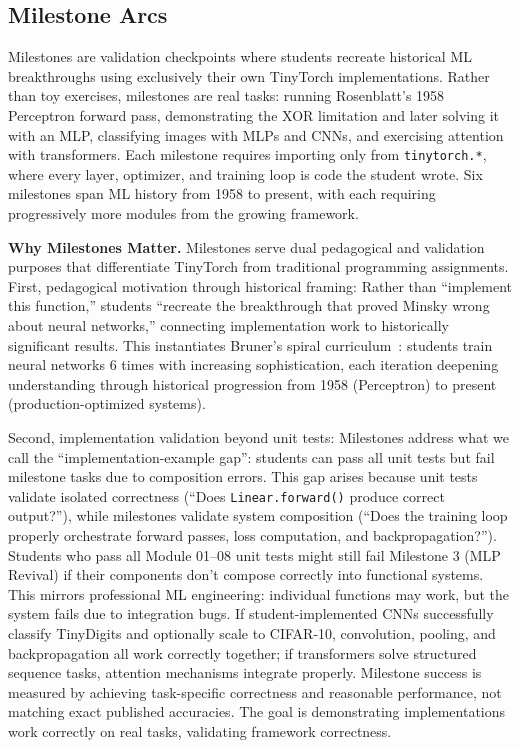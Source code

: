 \documentclass[10pt,twocolumn]{article}
\begin{document}
\subsection{Milestone Arcs}
\label{subsec:milestones}

Milestones are validation checkpoints where students recreate historical ML breakthroughs using exclusively their own TinyTorch implementations. Rather than toy exercises, milestones are real tasks: running Rosenblatt's 1958 Perceptron forward pass, demonstrating the XOR limitation and later solving it with an MLP, classifying images with MLPs and CNNs, and exercising attention with transformers. Each milestone requires importing only from \texttt{tinytorch.*}, where every layer, optimizer, and training loop is code the student wrote. Six milestones span ML history from 1958 to present, with each requiring progressively more modules from the growing framework.

\textbf{Why Milestones Matter.} Milestones serve dual pedagogical and validation purposes that differentiate TinyTorch from traditional programming assignments. First, pedagogical motivation through historical framing: Rather than ``implement this function,'' students ``recreate the breakthrough that proved Minsky wrong about neural networks,'' connecting implementation work to historically significant results. This instantiates Bruner's spiral curriculum~\citep{bruner1960process}: students train neural networks 6 times with increasing sophistication, each iteration deepening understanding through historical progression from 1958 (Perceptron) to present (production-optimized systems).

Second, implementation validation beyond unit tests: Milestones address what we call the ``implementation-example gap'': students can pass all unit tests but fail milestone tasks due to composition errors. This gap arises because unit tests validate isolated correctness (``Does \texttt{Linear.forward()} produce correct output?''), while milestones validate system composition (``Does the training loop properly orchestrate forward passes, loss computation, and backpropagation?''). Students who pass all Module 01--08 unit tests might still fail Milestone 3 (MLP Revival) if their components don't compose correctly into functional systems. This mirrors professional ML engineering: individual functions may work, but the system fails due to integration bugs. If student-implemented CNNs successfully classify TinyDigits and optionally scale to CIFAR-10, convolution, pooling, and backpropagation all work correctly together; if transformers solve structured sequence tasks, attention mechanisms integrate properly. Milestone success is measured by achieving task-specific correctness and reasonable performance, not matching exact published accuracies. The goal is demonstrating implementations work correctly on real tasks, validating framework correctness.
\end{document}
